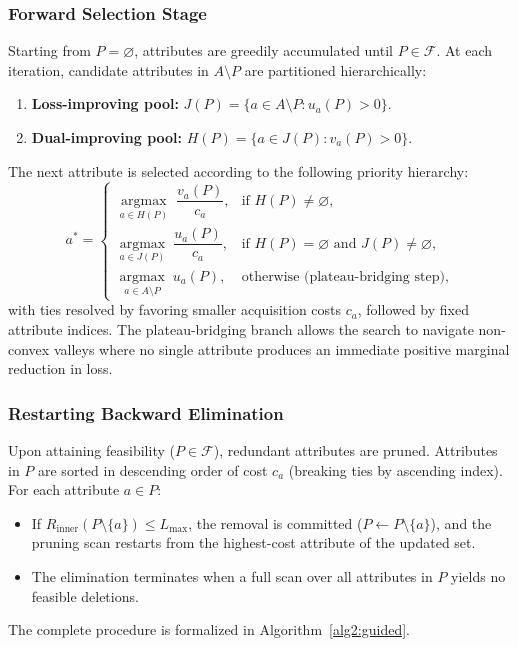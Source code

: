 \subsubsection{Forward Selection Stage}
Starting from $P = \varnothing$, attributes are greedily accumulated until $P \in \mathcal{F}$. At each iteration, candidate attributes in $A \setminus P$ are partitioned hierarchically:
\begin{enumerate}[label=(\roman*)]
	\item \textbf{Loss-improving pool:} $J(P) = \{a \in A \setminus P : u_a(P) > 0\}$.
	\item \textbf{Dual-improving pool:} $H(P) = \{a \in J(P) : v_a(P) > 0\}$.
\end{enumerate}
The next attribute is selected according to the following priority hierarchy:
\begin{equation}
	a^* = 
	\begin{cases}
		\underset{a \in H(P)}{\operatorname{argmax}} \; \dfrac{v_a(P)}{c_a}, & \text{if } H(P) \ne \varnothing, \\[8pt]
		\underset{a \in J(P)}{\operatorname{argmax}} \; \dfrac{u_a(P)}{c_a}, & \text{if } H(P) = \varnothing \text{ and } J(P) \ne \varnothing, \\[8pt]
		\underset{a \in A \setminus P}{\operatorname{argmax}} \; u_a(P), & \text{otherwise (plateau-bridging step)},
	\end{cases}
	\label{eq:selection-rule}
\end{equation}
with ties resolved by favoring smaller acquisition costs $c_a$, followed by fixed attribute indices. The plateau-bridging branch allows the search to navigate non-convex valleys where no single attribute produces an immediate positive marginal reduction in loss.

\subsubsection{Restarting Backward Elimination}
Upon attaining feasibility ($P \in \mathcal{F}$), redundant attributes are pruned. Attributes in $P$ are sorted in descending order of cost $c_a$ (breaking ties by ascending index). For each attribute $a \in P$:
\begin{itemize}
	\item If $R_{\mathrm{inner}}(P \setminus \{a\}) \le L_{\max}$, the removal is committed ($P \gets P \setminus \{a\}$), and the pruning scan restarts from the highest-cost attribute of the updated set.
	\item The elimination terminates when a full scan over all attributes in $P$ yields no feasible deletions.
\end{itemize}
The complete procedure is formalized in Algorithm~\ref{alg2:guided}.


